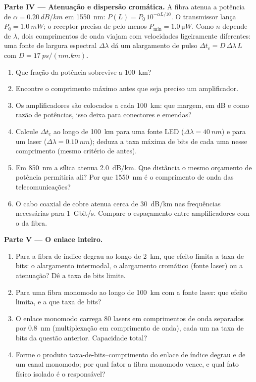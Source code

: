 \begin{problem}
\medskip
\noindent\textbf{Parte IV --- Atenuação e dispersão cromática.}
A fibra atenua a potência de $\alpha = \qty{0.20}{dB/km}$ em
\qty{1550}{nm}: $P(L) = P_0\,10^{-\alpha L/10}$. O transmissor
lança $P_0 = \qty{1.0}{mW}$; o receptor precisa de pelo menos
$P_{\min} = \qty{1.0}{\micro W}$. Como $n$ depende de $\lambda$, dois
comprimentos de onda viajam com velocidades ligeiramente diferentes: uma fonte de largura
espectral $\Delta\lambda$ dá um alargamento de pulso $\Delta t_c = D\,\Delta\lambda\,L$
com $D = \qty{17}{ps/(nm.km)}$.
\begin{enumerate}[resume]
  \item Que fração da potência sobrevive a \qty{100}{km}?
  \item Encontre o comprimento máximo antes que seja preciso um amplificador.
  \item Os amplificadores são colocados a cada \qty{100}{km}: que margem, em dB
        e como razão de potências, isso deixa para conectores e
        emendas?
  \item Calcule $\Delta t_c$ ao longo de \qty{100}{km} para uma fonte LED
        ($\Delta\lambda = \qty{40}{nm}$) e para um laser
        ($\Delta\lambda = \qty{0.10}{nm}$); deduza a taxa máxima de bits
        de cada uma nesse comprimento (mesmo critério de antes).
  \item Em \qty{850}{nm} a sílica atenua \qty{2.0}{dB/km}. Que
        distância o mesmo orçamento de potência permitiria ali? Por que
        \qty{1550}{nm} é o comprimento de onda das telecomunicações?
  \item O cabo coaxial de cobre atenua cerca de \qty{30}{dB/km} nas
        frequências necessárias para \qty{1}{Gbit/s}. Compare o espaçamento
        entre amplificadores com o da fibra.
\end{enumerate}

\medskip
\noindent\textbf{Parte V --- O enlace inteiro.}
\begin{enumerate}[resume]
  \item Para a fibra de índice degrau ao longo de \qty{2}{km}, que efeito limita
        a taxa de bits: o alargamento intermodal, o alargamento cromático (fonte laser)
        ou a atenuação? Dê a taxa de bits limite.
  \item Para uma fibra monomodo ao longo de \qty{100}{km} com a fonte
        laser: que efeito limita, e a que taxa de bits?
  \item O enlace monomodo carrega $80$ lasers em comprimentos de onda
        separados por \qty{0.8}{nm} (multiplexação em comprimento de onda), cada um na taxa
        de bits da questão anterior. Capacidade total?
  \item Forme o produto taxa-de-bits--comprimento do enlace de índice degrau e de
        um canal monomodo; por qual fator a fibra monomodo
        vence, e qual fato físico isolado é o responsável?
\end{enumerate}
\end{problem}
